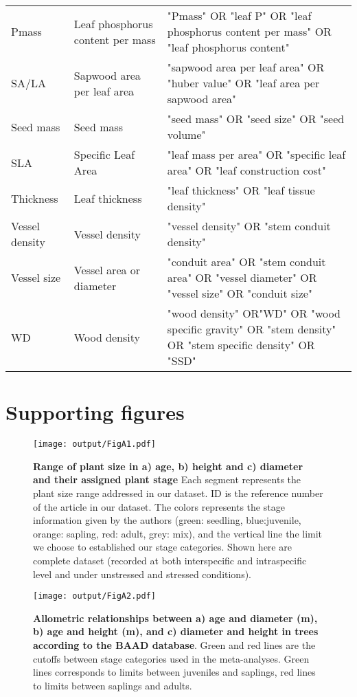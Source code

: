 \documentclass[a4paper]{article}\usepackage[]{graphicx}\usepackage[]{color}
\begin{document}
\begin{appendices}
\begin{table}[ht]
\begin{tabular}{p{3cm}p{3cm}p{8cm}}
  Pmass & Leaf phosphorus content per mass & "Pmass" OR "leaf P" OR  "leaf phosphorus content per mass" OR "leaf phosphorus content" \\
  SA/LA & Sapwood area per leaf area & "sapwood area per leaf area" OR "huber value" OR "leaf area per sapwood area" \\
  Seed mass & Seed mass & "seed mass" OR "seed size" OR "seed volume" \\
  SLA & Specific Leaf Area & "leaf mass per area" OR "specific leaf area" OR "leaf construction cost" \\
  Thickness & Leaf thickness & "leaf thickness"  OR "leaf tissue density" \\
  Vessel density & Vessel density & "vessel density" OR "stem conduit density" \\
  Vessel size & Vessel area or diameter & "conduit area" OR "stem conduit area" OR "vessel diameter" OR "vessel size" OR "conduit size"   \\
  WD & Wood density & "wood density" OR"WD" OR "wood specific gravity" OR "stem density" OR "stem specific density" OR "SSD" \\
   \hline
\end{tabular}
\end{table}

\newpage
\section{Supporting figures}\label{app:supp_info_figures}

\begin{figure}[htbp]
\centering
\texttt{[image: output/FigA1.pdf]}
\caption{\textbf{Range of plant size in \textbf{a)} age, \textbf{b)} height and \textbf{c)} diameter and their assigned plant stage} Each segment represents the plant size range addressed in our dataset. ID is the reference number of the article in our dataset. The colors represents the stage information given by the authors (green: seedling, blue:juvenile, orange: sapling, red: adult, grey: mix), and the vertical line the limit we choose to established our stage categories. Shown here are complete dataset (recorded at both interspecific and intraspecific level and under unstressed and stressed conditions). }
\label{FigA1}
\end{figure}


\begin{figure}[htbp]
\centering
\texttt{[image: output/FigA2.pdf]}
\caption{\textbf{Allometric relationships between a) age and diameter (m), b) age and height (m), and c) diameter and height in trees according to the BAAD database}. Green and red lines are the cutoffs between stage categories used in the meta-analyses. Green lines corresponds to limits between juveniles and saplings, red lines to limits between saplings and adults.}
\label{FigA2}
\end{figure}



\end{appendices}
\end{document}
